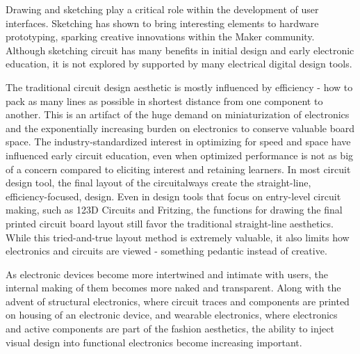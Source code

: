 \documentclass{sigchi}
\begin{document}
Drawing and sketching play a critical role within the development of user interfaces. Sketching has shown to bring interesting elements to hardware prototyping, sparking creative innovations within the Maker community. 
Although sketching circuit has many benefits in initial design and early electronic education, it is not explored by supported by many electrical digital design tools.


The traditional circuit design aesthetic is mostly influenced by efficiency - how to pack as many lines as possible in shortest distance from one component to another. 
This is an artifact of the huge demand on miniaturization of electronics and the exponentially increasing burden on electronics to conserve valuable board space. 
The industry-standardized interest in optimizing for speed and space have influenced early circuit education, even when optimized performance is not as big of a concern compared to eliciting interest and retaining learners. 
In most circuit design tool, the final layout of the circuitalways create the straight-line, efficiency-focused, design.
Even in design tools that focus on entry-level circuit making, such as 123D Circuits and Fritzing, the functions for drawing the final printed circuit board layout still favor the traditional straight-line aesthetics.
While this tried-and-true layout method is extremely valuable, it also limits how electronics and circuits are viewed - something pedantic instead of creative. 

As electronic devices become more intertwined and intimate with users, the internal making of them becomes more naked and transparent.
Along with the advent of structural electronics, where circuit traces and components are printed on housing of an electronic device, and wearable electronics, where electronics and active components are part of the fashion aesthetics, the ability to inject visual design into functional electronics become increasing important.
\end{document}
